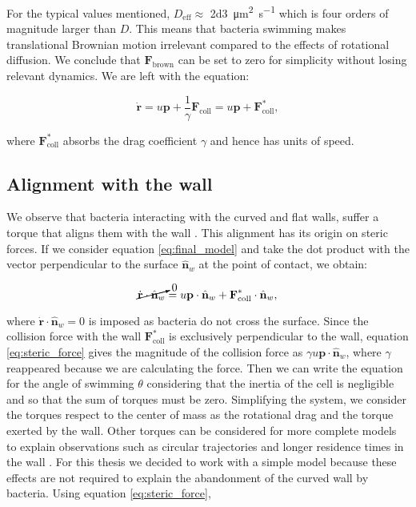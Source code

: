For the typical values mentioned, $D_{\text{eff}}\approx$ \SI[per-mode = symbol]{2d3}{\square\micro\meter \per \second} which is four orders of magnitude larger than $D$. This means that bacteria swimming makes translational Brownian motion irrelevant compared to the effects of rotational diffusion. We conclude that $\textbf{F}_{\text{brown}}$ can be set to zero for simplicity without losing relevant dynamics. We are left with the equation:

\begin{equation} \label{eq:final_model}
    \dot{\textbf{r}} = u\textbf{p} + \frac{1}{\gamma}\textbf{F}_{\text{coll}} = u\textbf{p} + \textbf{F}^*_{\text{coll}} ,
\end{equation}

where $\textbf{F}^*_{\text{coll}}$ absorbs the drag coefficient $\gamma$ and hence has units of speed.

\subsection{Alignment with the wall}
\label{section:steric alignment}

We observe that bacteria interacting with the curved and flat walls, suffer a torque that aligns them with the wall \cite{Bianchi2017HolographicBacteria}. This alignment has its origin on steric forces. If we consider equation \eqref{eq:final_model} and take the dot product with the vector perpendicular to the surface  $\hat{\textbf{n}}_w$ at the point of contact, we obtain:

\begin{equation} \label{eq:steric_force}
   \cancelto{0}{\dot{\textbf{r}} \cdot \hat{\textbf{n}}_w}  = u\textbf{p} \cdot \hat{\textbf{n}}_w + \textbf{F}^*_{\text{coll}} \cdot \hat{\textbf{n}}_w ,
\end{equation}

where $\dot{\textbf{r}} \cdot \hat{\textbf{n}}_w = 0$ is imposed as bacteria do not cross the surface. Since the collision force with the wall $\textbf{F}^*_{\text{coll}}$ is exclusively perpendicular to the wall, equation \eqref{eq:steric_force} gives the magnitude of the collision force as $\gamma u \textbf{p} \cdot \hat{\textbf{n}}_w$, where $\gamma$ reappeared because we are calculating the force. Then we can write the equation for the angle of swimming $\theta$ considering that the inertia of the cell is negligible and so that the sum of torques must be zero. Simplifying the system, we consider the torques respect to the center of mass as the rotational drag and the torque exerted by the wall. Other torques can be considered for more complete models to explain observations such as circular trajectories and longer residence times in the wall \cite{Lauga2006SwimmingBoundaries, Sipos2015HydrodynamicWalls}. For this thesis we decided to work with a simple model because these effects are not required to explain the abandonment of the curved wall by bacteria. Using equation \eqref{eq:steric_force}, 

